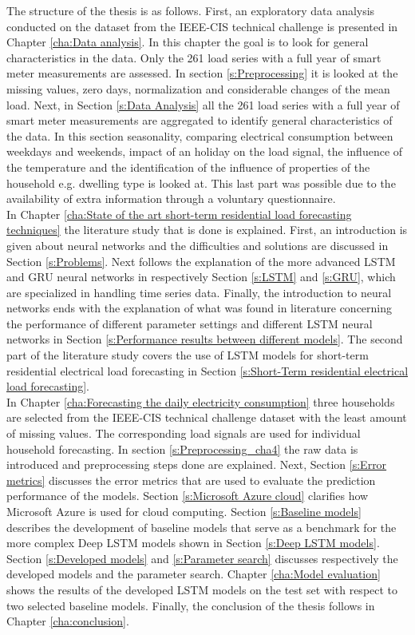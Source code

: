 The structure of the thesis is as follows. First, an exploratory data analysis conducted on the dataset from the IEEE-CIS technical challenge is presented in Chapter \ref{cha:Data analysis}. In this chapter the goal is to look for general characteristics in the data. Only the 261 load series with a full year of smart meter measurements are assessed. In section \ref{s:Preprocessing} it is looked at the missing values, zero days, normalization and considerable changes of the mean load. Next, in Section \ref{s:Data Analysis} all the 261 load series with a full year of smart meter measurements are aggregated to identify general characteristics of the data. In this section seasonality, comparing electrical consumption between weekdays and weekends, impact of an holiday on the load signal, the influence of the temperature and the identification of the influence of properties of the household e.g. dwelling type is looked at. This last part was possible due to the availability of extra information through a voluntary questionnaire.\\
In Chapter \ref{cha:State of the art short-term residential load forecasting techniques} the literature study that is done is explained. First, an introduction is given about neural networks and the difficulties and solutions are discussed in Section \ref{s:Problems}. Next follows the explanation of the more advanced LSTM and GRU neural networks in respectively Section \ref{s:LSTM} and \ref{s:GRU}, which are specialized in handling time series data. Finally, the introduction to neural networks ends with the explanation of what was found in literature concerning the performance of different parameter settings and different LSTM neural networks in Section \ref{s:Performance results between different models}. The second part of the literature study covers the use of LSTM models for short-term residential electrical load forecasting in Section \ref{s:Short-Term residential electrical load forecasting}.\\
In Chapter \ref{cha:Forecasting the daily electricity consumption} three households are selected from the IEEE-CIS technical challenge dataset with the least amount of missing values. The corresponding load signals are used for individual household forecasting. In section \ref{s:Preprocessing_cha4} the raw data is introduced and preprocessing steps done are explained. Next, Section \ref{s:Error metrics} discusses the error metrics that are used to evaluate the prediction performance of the models. Section \ref{s:Microsoft Azure cloud} clarifies how Microsoft Azure is used for cloud computing. Section \ref{s:Baseline models} describes the development of baseline models that serve as a benchmark for the more complex Deep LSTM models shown in Section \ref{s:Deep LSTM models}. Section \ref{s:Developed models} and \ref{s:Parameter search} discusses respectively the developed models and the parameter search. Chapter \ref{cha:Model evaluation} shows the results of the developed LSTM models on the test set with respect to two selected baseline models. Finally, the conclusion of the thesis follows in Chapter \ref{cha:conclusion}.





